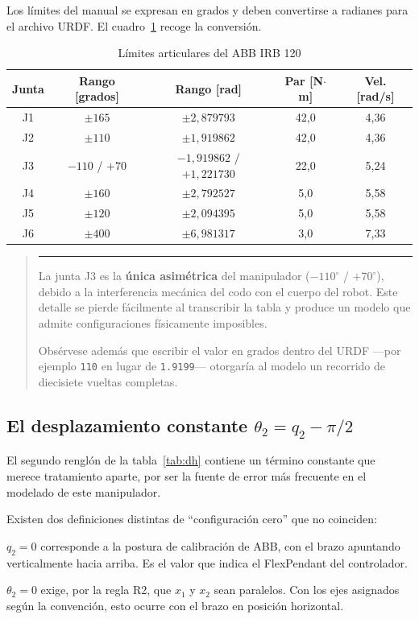 \documentclass[11pt,a4paper]{article}
\newenvironment{nota}
  {\begin{quote}\small\color{oscuro}\rule{2pt}{\baselineskip}\hspace{6pt}\ignorespaces}
  {\end{quote}}
\begin{document}
Los límites del manual se expresan en grados y deben convertirse a
radianes para el archivo URDF. El cuadro~\ref{tab:limites} recoge la
conversión.

\begin{table}[h]
\centering
\caption{Límites articulares del ABB IRB 120}
\label{tab:limites}
\small
\begin{tabular}{@{}ccccc@{}}
\toprule
\textbf{Junta} & \textbf{Rango [grados]} & \textbf{Rango [rad]} & \textbf{Par [N$\cdot$m]} & \textbf{Vel. [rad/s]} \\
\midrule
J1 & $\pm165$ & $\pm2{,}879793$ & 42,0 & 4,36 \\
J2 & $\pm110$ & $\pm1{,}919862$ & 42,0 & 4,36 \\
J3 & $-110$ / $+70$ & $-1{,}919862$ / $+1{,}221730$ & 22,0 & 5,24 \\
J4 & $\pm160$ & $\pm2{,}792527$ & 5,0 & 5,58 \\
J5 & $\pm120$ & $\pm2{,}094395$ & 5,0 & 5,58 \\
J6 & $\pm400$ & $\pm6{,}981317$ & 3,0 & 7,33 \\
\bottomrule
\end{tabular}
\end{table}

\begin{nota}
La junta J3 es la \textbf{única asimétrica} del manipulador
($-110^\circ$ / $+70^\circ$), debido a la interferencia mecánica del
codo con el cuerpo del robot. Este detalle se pierde fácilmente al
transcribir la tabla y produce un modelo que admite configuraciones
físicamente imposibles.

Obsérvese además que escribir el valor en grados dentro del URDF
—por ejemplo \texttt{110} en lugar de \texttt{1.9199}— otorgaría al
modelo un recorrido de diecisiete vueltas completas.
\end{nota}

\subsection{El desplazamiento constante \texorpdfstring{$\theta_2 = q_2 - \pi/2$}{theta2}}
\label{sec:offset}

El segundo renglón de la tabla~\ref{tab:dh} contiene un término
constante que merece tratamiento aparte, por ser la fuente de error más
frecuente en el modelado de este manipulador.

Existen dos definiciones distintas de ``configuración cero'' que no
coinciden:

\begin{description}[leftmargin=*,style=nextline]
\item[Cero mecánico del fabricante.] $q_2 = 0$ corresponde a la postura
de calibración de ABB, con el brazo apuntando verticalmente hacia
arriba. Es el valor que indica el FlexPendant del controlador.
\item[Cero matemático de D--H.] $\theta_2 = 0$ exige, por la regla R2,
que $x_1$ y $x_2$ sean paralelos. Con los ejes asignados según la
convención, esto ocurre con el brazo en posición horizontal.
\end{description}
\end{document}
